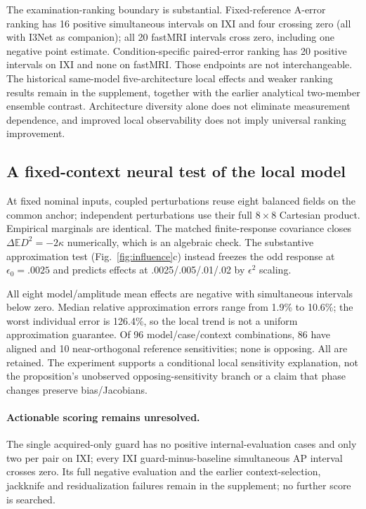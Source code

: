 \documentclass[10pt,twocolumn,letterpaper]{article}
\begin{document}
The examination-ranking boundary is substantial. Fixed-reference A-error ranking has 16 positive simultaneous intervals on IXI and four crossing zero (all with I3Net as companion); all 20 fastMRI intervals cross zero, including one negative point estimate. Condition-specific paired-error ranking has 20 positive intervals on IXI and none on fastMRI. Those endpoints are not interchangeable. The historical same-model five-architecture local effects and weaker ranking results remain in the supplement, together with the earlier analytical two-member ensemble contrast. Architecture diversity alone does not eliminate measurement dependence, and improved local observability does not imply universal ranking improvement.

\subsection{A fixed-context neural test of the local model}
At fixed nominal inputs, coupled perturbations reuse eight balanced fields on the common anchor; independent perturbations use their full $8\times8$ Cartesian product. Empirical marginals are identical. The matched finite-response covariance closes $\Delta\mathbb E D^2=-2\kappa$ numerically, which is an algebraic check. The substantive approximation test (Fig.~\ref{fig:influence}c) instead freezes the odd response at $\epsilon_0=.0025$ and predicts effects at .0025/.005/.01/.02 by $\epsilon^2$ scaling.

All eight model/amplitude mean effects are negative with simultaneous intervals below zero. Median relative approximation errors range from 1.9\% to 10.6\%; the worst individual error is 126.4\%, so the local trend is not a uniform approximation guarantee. Of 96 model/case/context combinations, 86 have aligned and 10 near-orthogonal reference sensitivities; none is opposing. All are retained. The experiment supports a conditional local sensitivity explanation, not the proposition's unobserved opposing-sensitivity branch or a claim that phase changes preserve bias/Jacobians.

\paragraph{Actionable scoring remains unresolved.}
The single acquired-only guard has no positive internal-evaluation cases and only two per pair on IXI; every IXI guard-minus-baseline simultaneous AP interval crosses zero. Its full negative evaluation and the earlier context-selection, jackknife and residualization failures remain in the supplement; no further score is searched.
\end{document}
